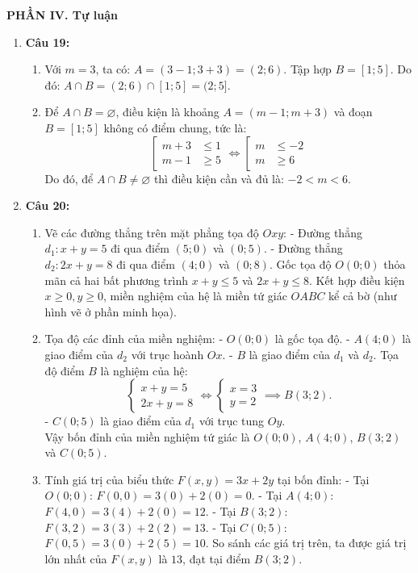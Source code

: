 \documentclass[12pt,a4paper]{article}
\begin{document}
\textbf{PHẦN IV. Tự luận}
\begin{enumerate}[resume]
\item \textbf{Câu 19:}
\begin{enumerate}
    \item Với $m = 3$, ta có:
    $A = (3 - 1; 3 + 3) = (2; 6)$.
    Tập hợp $B = [1; 5]$.
    Do đó: $A \cap B = (2; 6) \cap [1; 5] = (2; 5]$.
    \item Để $A \cap B = \varnothing$, điều kiện là khoảng $A = (m - 1; m + 3)$ và đoạn $B = [1; 5]$ không có điểm chung, tức là:
    \[
    \left[\begin{aligned}
    m + 3 &\le 1 \\
    m - 1 &\ge 5
    \end{aligned}\right.
    \iff
    \left[\begin{aligned}
    m &\le -2 \\
    m &\ge 6
    \end{aligned}\right.
    \]
    Do đó, để $A \cap B \ne \varnothing$ thì điều kiện cần và đủ là: $-2 < m < 6$.
\end{enumerate}

\item \textbf{Câu 20:}
\begin{enumerate}
    \item Vẽ các đường thẳng trên mặt phẳng tọa độ $Oxy$:
    - Đường thẳng $d_1: x + y = 5$ đi qua điểm $(5; 0)$ và $(0; 5)$.
    - Đường thẳng $d_2: 2x + y = 8$ đi qua điểm $(4; 0)$ và $(0; 8)$.
    Gốc tọa độ $O(0; 0)$ thỏa mãn cả hai bất phương trình $x + y \le 5$ và $2x + y \le 8$.
    Kết hợp điều kiện $x \ge 0, y \ge 0$, miền nghiệm của hệ là miền tứ giác $OABC$ kể cả bờ (như hình vẽ ở phần minh họa).
    \item Tọa độ các đỉnh của miền nghiệm:
    - $O(0; 0)$ là gốc tọa độ.
    - $A(4; 0)$ là giao điểm của $d_2$ với trục hoành $Ox$.
    - $B$ là giao điểm của $d_1$ và $d_2$. Tọa độ điểm $B$ là nghiệm của hệ:
    \[
    \begin{cases} x + y = 5 \\ 2x + y = 8 \end{cases} \iff \begin{cases} x = 3 \\ y = 2 \end{cases} \implies B(3; 2).
    \]
    - $C(0; 5)$ là giao điểm của $d_1$ với trục tung $Oy$.\\[2pt]
    Vậy bốn đỉnh của miền nghiệm tứ giác là $O(0; 0)$, $A(4; 0)$, $B(3; 2)$ và $C(0; 5)$.
    \item Tính giá trị của biểu thức $F(x, y) = 3x + 2y$ tại bốn đỉnh:
    - Tại $O(0; 0)$: $F(0, 0) = 3(0) + 2(0) = 0$.
    - Tại $A(4; 0)$: $F(4, 0) = 3(4) + 2(0) = 12$.
    - Tại $B(3; 2)$: $F(3, 2) = 3(3) + 2(2) = 13$.
    - Tại $C(0; 5)$: $F(0, 5) = 3(0) + 2(5) = 10$.
    So sánh các giá trị trên, ta được giá trị lớn nhất của $F(x, y)$ là $13$, đạt tại điểm $B(3; 2)$.
\end{enumerate}


\end{enumerate}
\end{document}
